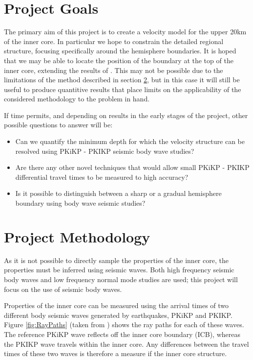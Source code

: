 \documentclass[11pt,a4paper]{article}
\begin{document}
\section{Project Goals}
\label{sec:Goals}
The primary aim of this project is to create a velocity model for the upper 20km of the inner core. In particular we hope to constrain the detailed regional structure, focusing specifically around the hemisphere boundaries. It is hoped that we may be able to locate the position of the boundary at the top of the inner core, extending the results of \cite{Waszek2011b}. This may not be possible due to the limitations of the method described in section \ref{sec:Methodology}, but in this case it will still be useful to produce quantitive results that place limits on the applicability of the considered methodology to the problem in hand.

If time permits, and depending on results in the early stages of the project, other possible questions to answer will be:
\begin{itemize}
	\item Can we quantify the minimum depth for which the velocity structure can be resolved using PKiKP - PKIKP seismic body wave studies?
	\item Are there any other novel techniques that would allow small PKiKP - PKIKP differential travel times to be measured to high accuracy?
	\item Is it possible to distinguish between a sharp or a gradual hemisphere boundary using body wave seismic studies?
\end{itemize}

\section{Project Methodology}
\label{sec:Methodology}
As it is not possible to directly sample the properties of the inner core, the properties must be inferred using seismic waves. Both high frequency seismic body waves and low frequency normal mode studies are used; this project will focus on the use of seismic body waves. 

Properties of the inner core can be measured using the arrival times of two different body seismic waves generated by earthquakes, PKiKP and PKIKP. Figure \ref{fig:RayPaths} (taken from \cite{Waszek2011a}) shows the ray paths for each of these waves. The reference PKiKP wave reflects off the inner core boundary (ICB), whereas the PKIKP wave travels within the inner core. Any differences between the travel times of these two waves is therefore a measure if the inner core structure.
\end{document}
